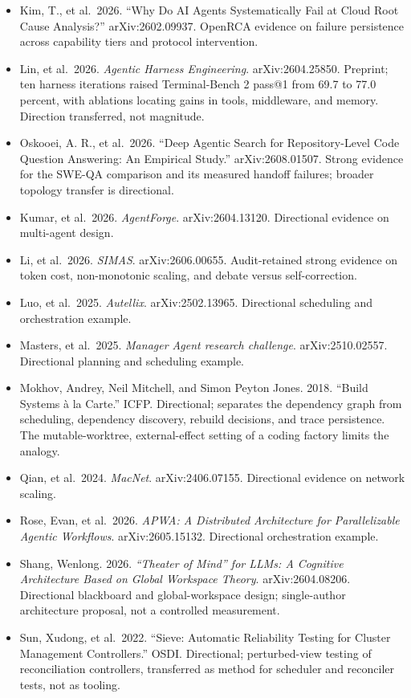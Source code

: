 \begin{itemize}
\item
  Kim, T., et al.~2026. ``Why Do AI Agents Systematically Fail at Cloud Root Cause Analysis?'' arXiv:2602.09937. OpenRCA evidence on failure persistence across capability tiers and protocol intervention.
\item
  Lin, et al.~2026. \emph{Agentic Harness Engineering}. arXiv:2604.25850. Preprint; ten harness iterations raised Terminal-Bench 2 pass@1 from 69.7 to 77.0 percent, with ablations locating gains in tools, middleware, and memory. Direction transferred, not magnitude.
\item
  Oskooei, A. R., et al.~2026. ``Deep Agentic Search for Repository-Level Code Question Answering: An Empirical Study.'' arXiv:2608.01507. Strong evidence for the SWE-QA comparison and its measured handoff failures; broader topology transfer is directional.
\item
  Kumar, et al.~2026. \emph{AgentForge}. arXiv:2604.13120. Directional evidence on multi-agent design.
\item
  Li, et al.~2026. \emph{SIMAS}. arXiv:2606.00655. Audit-retained strong evidence on token cost, non-monotonic scaling, and debate versus self-correction.
\item
  Luo, et al.~2025. \emph{Autellix}. arXiv:2502.13965. Directional scheduling and orchestration example.
\item
  Masters, et al.~2025. \emph{Manager Agent research challenge}. arXiv:2510.02557. Directional planning and scheduling example.
\item
  Mokhov, Andrey, Neil Mitchell, and Simon Peyton Jones. 2018. ``Build Systems à la Carte.'' ICFP. Directional; separates the dependency graph from scheduling, dependency discovery, rebuild decisions, and trace persistence. The mutable-worktree, external-effect setting of a coding factory limits the analogy.
\item
  Qian, et al.~2024. \emph{MacNet}. arXiv:2406.07155. Directional evidence on network scaling.
\item
  Rose, Evan, et al.~2026. \emph{APWA: A Distributed Architecture for Parallelizable Agentic Workflows}. arXiv:2605.15132. Directional orchestration example.
\item
  Shang, Wenlong. 2026. \emph{``Theater of Mind'' for LLMs: A Cognitive Architecture Based on Global Workspace Theory}. arXiv:2604.08206. Directional blackboard and global-workspace design; single-author architecture proposal, not a controlled measurement.
\item
  Sun, Xudong, et al.~2022. ``Sieve: Automatic Reliability Testing for Cluster Management Controllers.'' OSDI. Directional; perturbed-view testing of reconciliation controllers, transferred as method for scheduler and reconciler tests, not as tooling.

\end{itemize}
